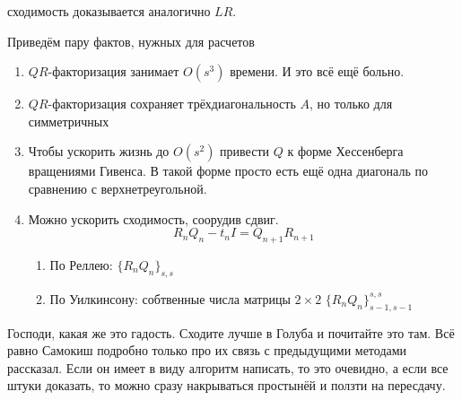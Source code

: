 \documentclass{trlnotes}
\begin{document}
сходимость доказывается аналогично $LR$.

Приведём пару фактов, нужных для расчетов
\begin{enumerate}
  \item $QR$-факторизация занимает $O(s^3)$ времени. И это всё ещё больно.
  \item $QR$-факторизация сохраняет трёхдиагональность $A$, но только для
    симметричных
  \item Чтобы ускорить жизнь до $O(s^2)$  привести $Q$
    к форме Хессенберга вращениями Гивенса.
    В такой форме просто есть ещё одна диагональ по сравнению с
    верхнетреугольной.
  \item Можно ускорить сходимость, соорудив сдвиг.
    \[
      R_n Q_n - t_n I = Q_{n+1} R_{n+1}
    \]
    \begin{enumerate}
      \item По Реллею: $\{R_nQ_n\}_{s,s}$
      \item По Уилкинсону: собтвенные числа матрицы $2 × 2$ $\{R_nQ_n\}^{s,s}_{s-1,s-1}$
    \end{enumerate}
\end{enumerate}

\vfil

Господи, какая же это гадость. Сходите лучше в Голуба и почитайте это там.
Всё равно Самокиш подробно только про их связь с предыдущими методами рассказал.
Если он имеет в виду алгоритм написать, то это очевидно, а если все штуки
доказать, то можно сразу накрываться простынёй и ползти на пересдачу.
\end{document}
